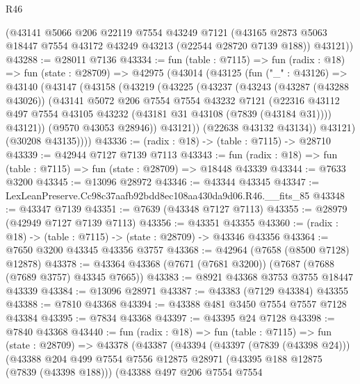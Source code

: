 \begin{lexlean}{R46}
\begin{coremodule}
      (@43141
        @5066
        @206
        @22119
        @7554
        @43249
        @7121
        (@43165 @2873 @5063 @18447 @7554 @43172 @43249 @43213 (@22544 @28720 @7139 @188))
        @43121))
@43288 := @28011 @7136
@43334 := fun (table : @7115) =>
  fun (radix : @18) =>
  fun (state : @28709) =>
  @42975
    (@43014
      (@43125
        (fun ("_" : @43126) =>
        @43140
          (@43147
            (@43158
              (@43219
                (@43225
                  (@43237
                    (@43243
                      (@43287 (@43288 @43026))
                      (@43141
                        @5072
                        @206
                        @7554
                        @7554
                        @43232
                        @7121
                        (@22316
                          @43112
                          @497
                          @7554
                          @43105
                          @43232
                          (@43181 @31 @43108 (@7839 (@43184 @31))))
                        @43121))
                    (@9570 @43053 @28946))
                  @43121))
              (@22638 @43132 @43134))
            @43121)
          (@30208 @43135))))
@43336 := (radix : @18) -> (table : @7115) -> @28710
@43339 := @42944 @7127 @7139 @7113
@43343 := fun (radix : @18) => fun (table : @7115) => fun (state : @28709) => @18448 @43339
@43344 := @7633 @3200
@43345 := @13096 @28972
@43346 := @43344 @43345
@43347 := LexLeanPreserve.Cc98c37aafb92bdd8ec108aa430da9d06.R46.__fits_85
@43348 := @43347 @7139
@43351 := @7639 (@43348 @7127 @7113)
@43355 := @28979 (@42949 @7127 @7139 @7113)
@43356 := @43351 @43355
@43360 := (radix : @18) -> (table : @7115) -> (state : @28709) -> @43346 @43356
@43364 := @7650 @3200 @43345 @43356 @3757
@43368 := @42964 (@7658 (@8500 @7128) @12878)
@43378 := @43364 @43368 (@7671 (@7681 @3200)) (@7687 (@7688 (@7689 @3757) @43345 @7665))
@43383 := @8921 @43368 @3753 @3755 @18447 @43339
@43384 := @13096 @28971
@43387 := @43383 (@7129 @43384) @43355
@43388 := @7810 @43368
@43394 := @43388 @481 @3450 @7554 @7557 @7128 @43384
@43395 := @7834 @43368
@43397 := @43395 @24 @7128
@43398 := @7840 @43368
@43440 := fun (radix : @18) =>
  fun (table : @7115) =>
  fun (state : @28709) =>
  @43378
    (@43387
      (@43394
        (@43397 (@7839 (@43398 @24)))
        (@43388
          @204
          @499
          @7554
          @7556
          @12875
          @28971
          (@43395 @188 @12875 (@7839 (@43398 @188)))
          (@43388
            @497
            @206
            @7554
            @7554

\end{coremodule}
\end{lexlean}
